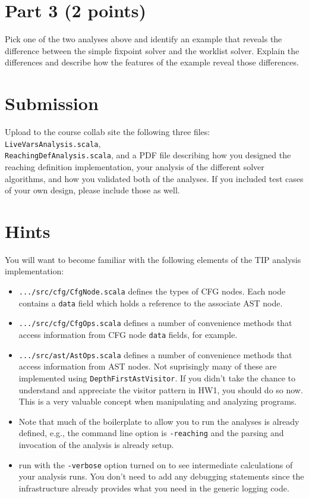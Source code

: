 \documentclass[12pt,letterpaper]{article}
\begin{document}
\section*{Part 3 (2 points)}
Pick one of the two analyses above and identify an example that reveals the difference between the simple fixpoint solver and the worklist solver.  Explain the differences and describe how the features of the example reveal those differences.

\section*{Submission} 
Upload to the course collab site the following three files: \texttt{LiveVarsAnalysis.scala},\\
\texttt{ReachingDefAnalysis.scala}, and a PDF file describing how you designed the reaching definition implementation, your analysis of the different solver algorithms, and how you validated both of the analyses.  If you included test cases of your own design, please include those as well.

\section*{Hints}
You will want to become familiar with the following elements of the TIP analysis implementation:
\begin{itemize}
\item \texttt{.../src/cfg/CfgNode.scala} defines the types of CFG nodes.  Each node contains a \texttt{data} field which holds a reference to the associate AST node.
\item \texttt{.../src/cfg/CfgOps.scala} defines a number of convenience methods that access information from CFG node \texttt{data} fields, for example.
\item \texttt{.../src/ast/AstOps.scala} defines a number of convenience methods that access information from AST nodes.  Not suprisingly many of these are implemented using \texttt{DepthFirstAstVisitor}.  If you didn't take the chance to understand and appreciate the visitor pattern in HW1, you should do so now.  This is a very valuable concept when manipulating and analyzing programs.
\item Note that much of the boilerplate to allow you to run the analyses is already defined, e.g., the command line option is \texttt{-reaching} and the parsing and invocation of the analysis is already setup.
\item run with the \texttt{-verbose} option turned on to see intermediate calculations of your analysis runs.  You don't need to add any debugging statements since the infrastructure already provides what you need in the generic logging code.
\end{itemize}
\end{document}
